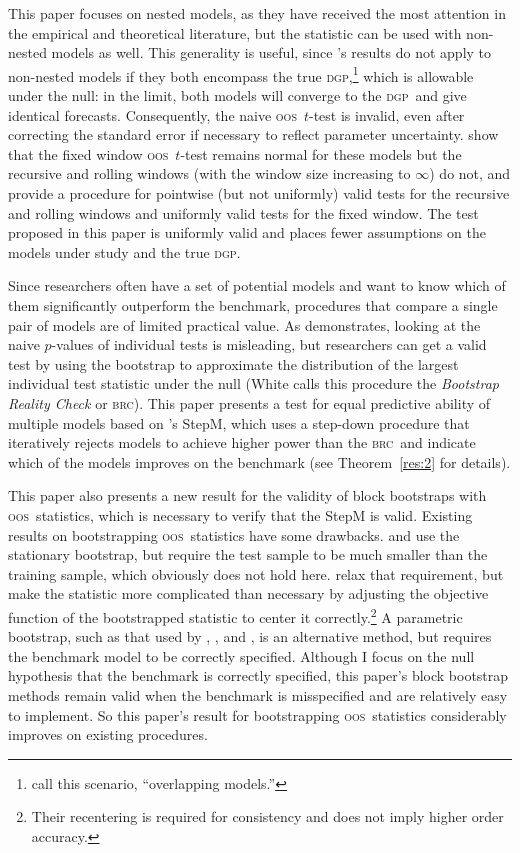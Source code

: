 \documentclass[11pt,fleqn]{article}
\newcommand\citepos[2][]{\citeauthor{#2}'s \citeyearpar[#1]{#2}}
\theoremstyle{definition}
\newcommand{\brc}{\textsc{brc}}
\newcommand{\dgp}{\textsc{dgp}}
\newcommand{\oos}{\textsc{oos}}
\begin{document}
This paper focuses on nested models, as they have received the most
attention in the empirical and theoretical literature, but the
statistic can be used with non-nested models as well.  This generality
is useful, since \citepos{Wes:96} results do not apply to non-nested
models if they both encompass the true \dgp,\footnote{\citet{ClM:11b}
  call this scenario, ``overlapping models.''} which is allowable
under the null: in the limit, both models will converge to the \dgp\
and give identical forecasts.  Consequently, the naive \oos\ $t$-test
is invalid, even after correcting the standard error if necessary to
reflect parameter uncertainty.  \citet{ClM:11b} show that the fixed
window \oos\ $t$-test remains normal for these models but the
recursive and rolling windows (with the window size increasing to
$\infty$) do not, and provide a procedure for pointwise (but not
uniformly) valid tests for the recursive and rolling windows and
uniformly valid tests for the fixed window.  The test proposed in this
paper is uniformly valid and places fewer assumptions on the models
under study and the true \dgp.

Since researchers often have a set of potential models and want to
know which of them significantly outperform the benchmark, procedures
that compare a single pair of models are of limited practical value.
As \citet{Whi:00} demonstrates, looking at the naive $p$-values of
individual tests is misleading, but researchers can get a valid test
by using the bootstrap to approximate the distribution of the largest
individual test statistic under the null (White calls this procedure
the \textit{Bootstrap Reality Check} or \brc).  This paper presents a test
for equal predictive ability of multiple models based on
\citepos{RoW:05} StepM, which uses a step-down procedure that
iteratively rejects models to achieve higher power than the \brc\ and
indicate which of the models improves on the benchmark (see
Theorem~\ref{res:2} for details).

This paper also presents a new result for the validity of block
bootstraps with \oos\ statistics, which is necessary to verify that
the StepM is valid.  Existing results on bootstrapping \oos\
statistics have some drawbacks.  \citet{Whi:00} and \citet{Han:05} use
the stationary bootstrap, but require the test sample to be much
smaller than the training sample, which obviously does not hold here.
\citet{CoS:07} relax that requirement, but make the statistic more
complicated than necessary by adjusting the objective function of the
bootstrapped statistic to center it correctly.\footnote{Their
  recentering is required for consistency and does not imply higher
  order accuracy.}  A parametric bootstrap, such as that used by
\cite{Mar:95}, \cite{Lut:99}, and \citet{ClM:12b}, is an alternative
method, but requires the benchmark model to be correctly specified.
Although I focus on the null hypothesis that the benchmark is
correctly specified, this paper's block bootstrap methods remain valid
when the benchmark is misspecified and are relatively easy to
implement.  So this paper's result for bootstrapping \oos\ statistics
considerably improves on existing procedures.
\end{document}

